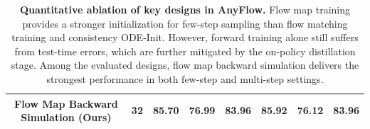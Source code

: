 \begin{table}[!tb]
{\begin{tabular}{c|c|ccc|ccc}
        \rowcolor{mitblue}Flow Map Backward Simulation (Ours) & 32 & \textbf{85.70} & \textbf{76.99} & \textbf{83.96} & \textbf{85.92} & \textbf{76.12} & \textbf{83.96} \\
        \bottomrule
        \end{tabular}}    \caption{\textbf{Quantitative ablation of key designs in AnyFlow.}
        Flow map training provides a stronger initialization for few-step sampling than flow matching training and consistency ODE-Init. However, forward training alone still suffers from test-time errors, which are further mitigated by the on-policy distillation stage. Among the evaluated designs, flow map backward simulation delivers the strongest performance in both few-step and multi-step settings.
      }
    \label{tab:ablation_anyflow}
\end{table}